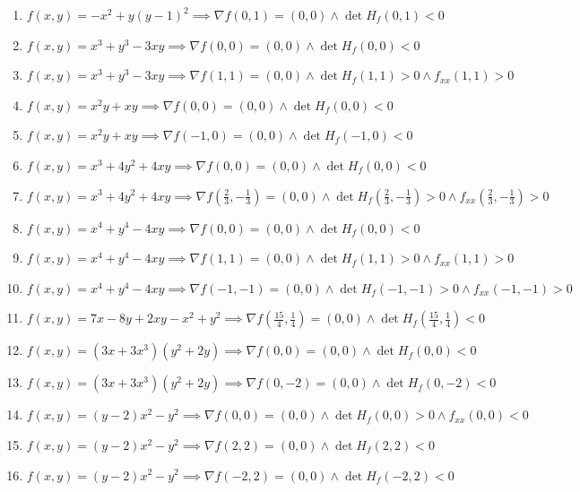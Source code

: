 \documentclass[11pt,a4paper]{article}
\begin{document}
\begin{enumerate}
\item $\displaystyle f(x, y) = -x^{2} + y(y - 1)^{2} \implies \nabla f(0, 1) = (0, 0) \land \det H_{f}(0, 1) < 0$
\item $\displaystyle f(x, y) = x^{3} + y^{3} - 3xy \implies \nabla f(0, 0) = (0, 0) \land \det H_{f}(0, 0) < 0$
\item $\displaystyle f(x, y) = x^{3} + y^{3} - 3xy \implies \nabla f(1, 1) = (0, 0) \land \det H_{f}(1, 1) > 0 \land f_{xx}(1, 1) > 0$
\item $\displaystyle f(x, y) = x^{2} y + xy \implies \nabla f(0, 0) = (0, 0) \land \det H_{f}(0, 0) < 0$
\item $\displaystyle f(x, y) = x^{2} y + xy \implies \nabla f(-1, 0) = (0, 0) \land \det H_{f}(-1, 0) < 0$
\item $\displaystyle f(x, y) = x^{3} + 4y^{2} + 4xy \implies \nabla f(0, 0) = (0, 0) \land \det H_{f}(0, 0) < 0$
\item $\displaystyle f(x, y) = x^{3} + 4y^{2} + 4xy \implies \nabla f\left( \frac{2}{3}, -\frac{1}{3} \right) = (0, 0) \land \det H_{f}\left( \frac{2}{3}, -\frac{1}{3} \right) > 0 \land f_{xx}\left( \frac{2}{3}, -\frac{1}{3} \right) > 0$
\item $\displaystyle f(x, y) = x^{4} + y^{4} - 4xy \implies \nabla f(0, 0) = (0, 0) \land \det H_{f}(0, 0) < 0$
\item $\displaystyle f(x, y) = x^{4} + y^{4} - 4xy \implies \nabla f(1, 1) = (0, 0) \land \det H_{f}(1, 1) > 0 \land f_{xx}(1, 1) > 0$
\item $\displaystyle f(x, y) = x^{4} + y^{4} - 4xy \implies \nabla f(-1, -1) = (0, 0) \land \det H_{f}(-1, -1) > 0 \land f_{xx}(-1, -1) > 0$
\item $\displaystyle f(x, y) = 7x - 8y + 2xy - x^{2} + y^{2} \implies \nabla f\left( \frac{15}{4}, \frac{1}{4} \right) = (0, 0) \land \det H_{f}\left( \frac{15}{4}, \frac{1}{4} \right) < 0$
\item $\displaystyle f(x, y) = (3x + 3x^{3})(y^{2} + 2y) \implies \nabla f(0, 0) = (0, 0) \land \det H_{f}(0, 0) < 0$
\item $\displaystyle f(x, y) = (3x + 3x^{3})(y^{2} + 2y) \implies \nabla f(0, -2) = (0, 0) \land \det H_{f}(0, -2) < 0$
\item $\displaystyle f(x, y) = (y - 2) x^{2} - y^{2} \implies \nabla f(0, 0) = (0, 0) \land \det H_{f}(0, 0) > 0 \land f_{xx}(0, 0) < 0$
\item $\displaystyle f(x, y) = (y - 2) x^{2} - y^{2} \implies \nabla f(2, 2) = (0, 0) \land \det H_{f}(2, 2) < 0$
\item $\displaystyle f(x, y) = (y - 2) x^{2} - y^{2} \implies \nabla f(-2, 2) = (0, 0) \land \det H_{f}(-2, 2) < 0$

\end{enumerate}
\end{document}
